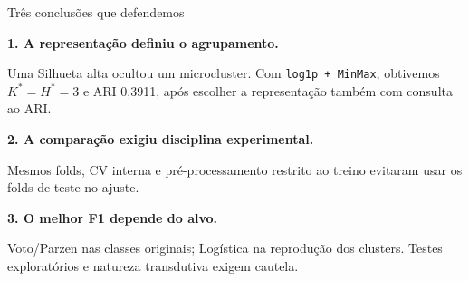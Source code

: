 \documentclass[aspectratio=169,11pt]{beamer}
\begin{document}
\begin{frame}[t]{Três conclusões que defendemos}
\vspace{1mm}
\begin{simplebox}
\textbf{1. A representação definiu o agrupamento.}\par
\small Uma Silhueta alta ocultou um microcluster. Com \texttt{log1p + MinMax}, obtivemos $K^*=H^*=3$ e ARI 0,3911, após escolher a representação também com consulta ao ARI.
\end{simplebox}
\vspace{1mm}
\begin{simplebox}
\textbf{2. A comparação exigiu disciplina experimental.}\par
\small Mesmos folds, CV interna e pré-processamento restrito ao treino evitaram usar os folds de teste no ajuste.
\end{simplebox}
\vspace{1mm}
\begin{simplebox}
\textbf{3. O melhor F1 depende do alvo.}\par
\small Voto/Parzen nas classes originais; Logística na reprodução dos clusters. Testes exploratórios e natureza transdutiva exigem cautela.
\end{simplebox}
\end{frame}
\end{document}
